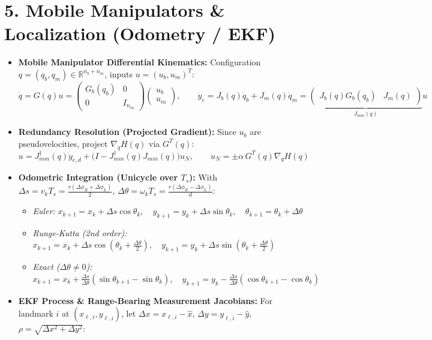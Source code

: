 \documentclass[10pt, a4paper]{article}
\begin{document}
\section*{5. Mobile Manipulators \& Localization (Odometry / EKF)}

\begin{itemize}
    \item \textbf{Mobile Manipulator Differential Kinematics:} Configuration $q = (q_b, q_m) \in \mathbb{R}^{n_b + n_m}$, inputs $u = (u_b, u_m)^T$:
    \[
        \dot{q} = G(q)u = \begin{pmatrix} G_b(q_b) & 0 \\ 0 & I_{n_m} \end{pmatrix} \begin{pmatrix} u_b \\ u_m \end{pmatrix}, \qquad \dot{y}_e = J_b(q)\dot{q}_b + J_m(q)\dot{q}_m = \underbrace{\begin{pmatrix} J_b(q)G_b(q_b) & J_m(q) \end{pmatrix}}_{J_{mm}(q)} u
    \]
    \item \textbf{Redundancy Resolution (Projected Gradient):} Since $u_b$ are pseudovelocities, project $\nabla_q H(q)$ via $G^T(q)$:
    \[
        u = J_{mm}^\dagger(q)\dot{y}_{e,d} + \Big(I - J_{mm}^\dagger(q)J_{mm}(q)\Big) u_N, \qquad u_N = \pm \alpha \, G^T(q)\nabla_q H(q)
    \]
    \item \textbf{Odometric Integration (Unicycle over $T_s$):} With $\Delta s = v_k T_s = \frac{r(\Delta\phi_R + \Delta\phi_L)}{2}$, $\Delta\theta = \omega_k T_s = \frac{r(\Delta\phi_R - \Delta\phi_L)}{d}$:
    \begin{itemize}
        \item \textit{Euler:} $x_{k+1} = x_k + \Delta s\cos\theta_k, \quad y_{k+1} = y_k + \Delta s\sin\theta_k, \quad \theta_{k+1} = \theta_k + \Delta\theta$
        \item \textit{Runge-Kutta (2nd order):} $x_{k+1} = x_k + \Delta s\cos(\theta_k + \frac{\Delta\theta}{2}), \quad y_{k+1} = y_k + \Delta s\sin(\theta_k + \frac{\Delta\theta}{2})$
        \item \textit{Exact ($\Delta\theta \neq 0$):} $x_{k+1} = x_k + \frac{\Delta s}{\Delta\theta}(\sin\theta_{k+1} - \sin\theta_k), \quad y_{k+1} = y_k - \frac{\Delta s}{\Delta\theta}(\cos\theta_{k+1} - \cos\theta_k)$
    \end{itemize}
    \item \textbf{EKF Process \& Range-Bearing Measurement Jacobians:}
    For landmark $i$ at $(x_{\ell,i}, y_{\ell,i})$, let $\Delta x = x_{\ell,i} - \hat{x}$, $\Delta y = y_{\ell,i} - \hat{y}$, $\rho = \sqrt{\Delta x^2 + \Delta y^2}$:

\end{itemize}
\end{document}
